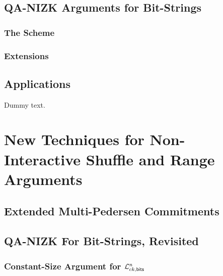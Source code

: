     \section{QA-NIZK Arguments for Bit-Strings} \label{sec:bits}
    
        

        \subsection{The Scheme} \label{sec:bits-scheme}

            

        \subsection{Extensions}

            

    \section{Applications}

    Dummy text.

\chapter{New Techniques for Non-Interactive Shuffle and Range Arguments}

    

    \section{Extended Multi-Pedersen Commitments}

        

    \section{QA-NIZK For Bit-Strings, Revisited}

        

        \subsection{Constant-Size Argument for $\mathcal{L}_{ck,\mathsf{bits}}^n$}

            



